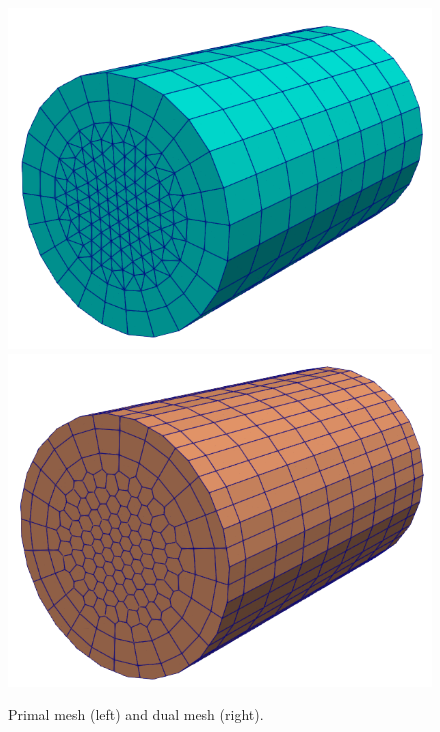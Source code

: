\documentclass{article}
\begin{document}
\begin{figure}
    \centering
    \includegraphics[scale=0.3]{primal_mesh.png}
    \hspace{1cm}
    \includegraphics[scale=0.3]{dual_mesh.png}
    \caption{Primal mesh (left) and dual mesh (right).}
    \label{fig:primal_dual_meshes}
\end{figure}
\end{document}
